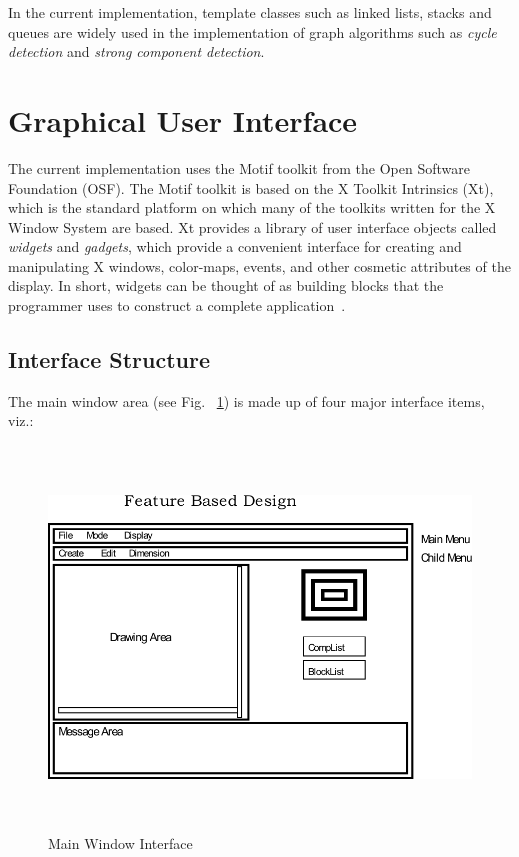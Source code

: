 		In the current implementation, template classes such as linked lists,
		stacks and queues are widely used in the implementation of graph
		algorithms such as {\em cycle detection} and {\em strong component
		detection}.

	\section{Graphical User Interface}

	The current implementation uses the Motif toolkit from the Open Software
	Foundation (OSF). The Motif toolkit is based on the X Toolkit Intrinsics 
	(Xt), which is the standard platform on which many of the toolkits
	written for the X Window System are based. Xt provides a library of
	user interface objects called {\it widgets} and {\it gadgets}, which
	provide a convenient interface for creating and manipulating X windows,
	color-maps, events, and other cosmetic attributes of the display. In
	short, widgets can be thought of as building blocks that the programmer
	uses to construct a complete application~\cite{Motif}.

	\subsection{Interface Structure}
		The main window area (see Fig. ~\ref{mainwin}) is made up of four major 
		interface items, viz.:


            \begin{figure}[htbp]
\includegraphics[width=6.0in,height=4.0in]{MAINWIN.pdf}
            \caption{Main Window Interface}
            \label{mainwin}
            \end{figure}

